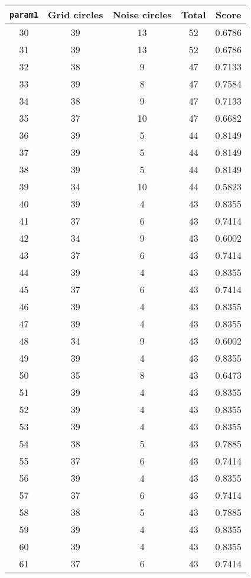 \documentclass[letterpaper, 12pt]{article}
\begin{document}
\begin{longtable}{|c|c|c|c|c|}
\hline
\textbf{\texttt{param1}} & \textbf{Grid circles} & \textbf{Noise circles} & \textbf{Total} & \textbf{Score} \\
\hline
30 & 39 & 13 & 52 & 0.6786 \\
\hline
31 & 39 & 13 & 52 & 0.6786 \\
\hline
32 & 38 & 9 & 47 & 0.7133 \\
\hline
33 & 39 & 8 & 47 & 0.7584 \\
\hline
34 & 38 & 9 & 47 & 0.7133 \\
\hline
35 & 37 & 10 & 47 & 0.6682 \\
\hline
36 & 39 & 5 & 44 & 0.8149 \\
\hline
37 & 39 & 5 & 44 & 0.8149 \\
\hline
38 & 39 & 5 & 44 & 0.8149 \\
\hline
39 & 34 & 10 & 44 & 0.5823 \\
\hline
40 & 39 & 4 & 43 & 0.8355 \\
\hline
41 & 37 & 6 & 43 & 0.7414 \\
\hline
42 & 34 & 9 & 43 & 0.6002 \\
\hline
43 & 37 & 6 & 43 & 0.7414 \\
\hline
44 & 39 & 4 & 43 & 0.8355 \\
\hline
45 & 37 & 6 & 43 & 0.7414 \\
\hline
46 & 39 & 4 & 43 & 0.8355 \\
\hline
47 & 39 & 4 & 43 & 0.8355 \\
\hline
48 & 34 & 9 & 43 & 0.6002 \\
\hline
49 & 39 & 4 & 43 & 0.8355 \\
\hline
50 & 35 & 8 & 43 & 0.6473 \\
\hline
51 & 39 & 4 & 43 & 0.8355 \\
\hline
52 & 39 & 4 & 43 & 0.8355 \\
\hline
53 & 39 & 4 & 43 & 0.8355 \\
\hline
54 & 38 & 5 & 43 & 0.7885 \\
\hline
55 & 37 & 6 & 43 & 0.7414 \\
\hline
56 & 39 & 4 & 43 & 0.8355 \\
\hline
57 & 37 & 6 & 43 & 0.7414 \\
\hline
58 & 38 & 5 & 43 & 0.7885 \\
\hline
59 & 39 & 4 & 43 & 0.8355 \\
\hline
60 & 39 & 4 & 43 & 0.8355 \\
\hline
61 & 37 & 6 & 43 & 0.7414 \\

\end{longtable}
\end{document}
